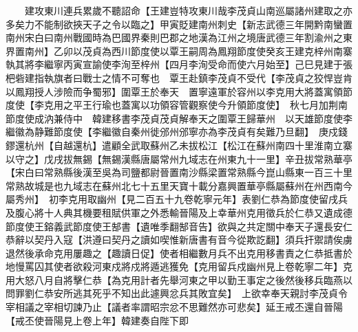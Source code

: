 　　建攻東川連兵累歲不聽詔命【王建豈特攻東川哉李茂貞山南巡屬諸州建取之亦多矣力不能制欲挾天子之令以臨之】甲寅貶建南州刺史【新志武德三年開黔南蠻置南州宋白曰南州戰國時為巴國界秦則巴郡之地漢為江州之境唐武德三年割渝州之東界置南州】乙卯以茂貞為西川節度使以覃王嗣周為鳳翔節度使癸亥王建克梓州南寨執其將李繼寧丙寅宣諭使李洵至梓州【四月李洵受命而使六月始至】己巳見建于張杷砦建指執旗者曰戰士之情不可奪也　覃王赴鎮李茂貞不受代【李茂貞之狡悍豈肯以鳳翔授人涉險而争蜀邪】圍覃王於奉天　置寧遠軍於容州以李克用大將蓋寓領節度使【李克用之平王行瑜也蓋寓以功領容管觀察使今升領節度使】　秋七月加荆南節度使成汭兼侍中　韓建移書李茂貞茂貞解奉天之圍覃王歸華州　以天雄節度使李繼徽為静難節度使【李繼徽自秦州徙邠州邠寧亦為李茂貞有矣難乃旦翻】　庚戍錢鏐還杭州【自越還杭】遣顧全武取蘇州乙未拔松江【松江在蘇州南四十里淮南立寨以守之】戊戌拔無錫【無錫漢縣唐屬常州九域志在州東九十一里】辛丑拔常熟華亭【宋白曰常熟縣後漢至吳為司鹽都尉晉置南沙縣梁置常熟縣今崑山縣東一百三十里常熟故城是也九域志在蘇州北七十五里天寶十載分嘉興置華亭縣屬蘇州在州西南今屬秀州】　初李克用取幽州【見二百五十九卷乾寧元年】表劉仁恭為節度使留戌兵及腹心將十人典其機要租賦供軍之外悉輸晉陽及上幸華州克用徵兵於仁恭又遺成德節度使王鎔義武節度使王郜書【遺唯季翻郜音告】欲與之共定關中奉天子還長安仁恭辭以契丹入寇【洪遵曰契丹之讀如喫惟新唐書有音今從欺訖翻】須兵扞禦請俟虜退然後承命克用屢趣之【趣讀日促】使者相繼數月兵不出克用移書責之仁恭抵書於地慢罵囚其使者欲殺河東戍將戍將遁逃獲免【克用留兵戍幽州見上卷乾寧二年】克用大怒八月自將擊仁恭【為克用計者先舉河東之甲以勤王事定之後然後移兵臨燕以問罪劉仁恭安所逃其死乎不知出此遽興忿兵其敗宜矣】　上欲幸奉天親討李茂貞令宰相議之宰相切諫乃止【議者率謂昭宗忿不思難然亦可悲矣】延王戒丕還自晉陽【戒丕使晉陽見上卷上年】韓建奏自陛下即

